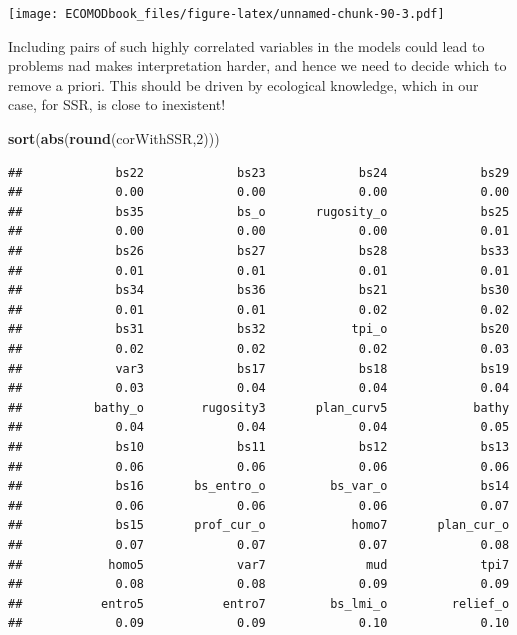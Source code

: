 \documentclass[
]{book}
\newenvironment{Shaded}{\begin{snugshade}}{\end{snugshade}}
\newcommand{\DecValTok}[1]{\textcolor[rgb]{0.00,0.00,0.81}{#1}}
\newcommand{\FunctionTok}[1]{\textcolor[rgb]{0.13,0.29,0.53}{\textbf{#1}}}
\newcommand{\NormalTok}[1]{#1}
\begin{document}
\texttt{[image: ECOMODbook\_files/figure-latex/unnamed-chunk-90-3.pdf]}

Including pairs of such highly correlated variables in the models could lead to problems nad makes interpretation harder, and hence we need to decide which to remove a priori. This should be driven by ecological knowledge, which in our case, for SSR, is close to inexistent!

\begin{Shaded}
\begin{Highlighting}[]
\FunctionTok{sort}\NormalTok{(}\FunctionTok{abs}\NormalTok{(}\FunctionTok{round}\NormalTok{(corWithSSR,}\DecValTok{2}\NormalTok{)))}
\end{Highlighting}
\end{Shaded}

\begin{verbatim}
##             bs22             bs23             bs24             bs29 
##             0.00             0.00             0.00             0.00 
##             bs35             bs_o       rugosity_o             bs25 
##             0.00             0.00             0.00             0.01 
##             bs26             bs27             bs28             bs33 
##             0.01             0.01             0.01             0.01 
##             bs34             bs36             bs21             bs30 
##             0.01             0.01             0.02             0.02 
##             bs31             bs32            tpi_o             bs20 
##             0.02             0.02             0.02             0.03 
##             var3             bs17             bs18             bs19 
##             0.03             0.04             0.04             0.04 
##          bathy_o        rugosity3       plan_curv5            bathy 
##             0.04             0.04             0.04             0.05 
##             bs10             bs11             bs12             bs13 
##             0.06             0.06             0.06             0.06 
##             bs16       bs_entro_o         bs_var_o             bs14 
##             0.06             0.06             0.06             0.07 
##             bs15       prof_cur_o            homo7       plan_cur_o 
##             0.07             0.07             0.07             0.08 
##            homo5             var7              mud             tpi7 
##             0.08             0.08             0.09             0.09 
##           entro5           entro7         bs_lmi_o         relief_o 
##             0.09             0.09             0.10             0.10 

\end{verbatim}
\end{document}
